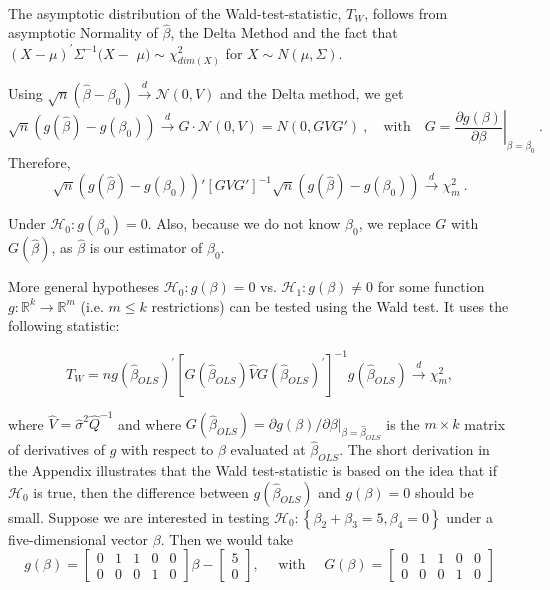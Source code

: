 \begin{definition}\label{Wald Test}
  \ 

  The asymptotic distribution of the Wald-test-statistic, $T_W$,
  follows from asymptotic Normality of $\hat{\beta}$, 
  the Delta Method and the fact that $(X-\mu)^\prime\Sigma^{-1}(X-$ $\mu)\sim\chi_{dim(X)}^2$ for $X\sim N(\mu,\Sigma).$

  Using $\sqrt{n}(\hat{\beta}-\beta_{0})\stackrel{d}{\rightarrow}\mathcal{N}(0, V)$ and the Delta method, we get
  $$\sqrt{n}\left(g(\hat{\beta})-g(\beta_0)\right)\overset{d}{\to}G\cdot \mathcal{N}(0, V)=N(0,GVG')\:,\quad\mathrm{with}\quad G=\left.\frac{\partial g(\beta)}{\partial\beta}\right|_{\beta=\beta_0}\:.$$
  Therefore,
  $$\sqrt{n}\left(g(\hat{\beta})-g(\beta_0)\right)'[GVG']^{-1}\sqrt{n}\left(g(\hat{\beta})-g(\beta_0)\right)\stackrel{d}{\to}\chi_m^2\:.$$

  Under $\mathcal{H}_0: g(\beta_0)=0.$ Also, because we do not know $\beta_0$, we replace $G$ with $G(\hat{\beta})$, as $\hat{\beta}$ is our
  estimator of $\beta_0.$
\end{definition}

More general hypotheses  $\mathcal{H}_{0}: g(\beta)=0 $ vs.  $\mathcal{H}_{1}: g(\beta) \neq 0$  for some function  $g: \mathbb{R}^{k} \rightarrow \mathbb{R}^{m}$  (i.e. $ m \leq k $ restrictions) can be tested using the Wald test. It uses the following statistic:

$$T_{W}=n g\left(\hat{\beta}_{O L S}\right)^{\prime}\left[G\left(\hat{\beta}_{O L S}\right) \hat{V} G\left(\hat{\beta}_{O L S}\right)^{\prime}\right]^{-1} g\left(\hat{\beta}_{O L S}\right) \xrightarrow{d} \chi_{m}^{2},$$

where $\hat{V}=\hat{\sigma}^{2} \hat{Q}^{-1}$ and where  $G\left(\hat{\beta}_{O L S}\right)=\partial g(\beta) /\left.\partial \beta\right|_{\beta=\hat{\beta}_{O L S}}$  is the $m \times k$ matrix of derivatives of $g$ with respect to $\beta$  evaluated at  $\hat{\beta}_{OLS}$. 
The short derivation in the Appendix illustrates that the Wald test-statistic is based on the idea that if $\mathcal{H}_{0}$  is true, then the difference between  $g\left(\hat{\beta}_{O L S}\right)$ and $g(\beta)=0$ should be small. Suppose we are interested in testing  $\mathcal{H}_{0}:\left\{\beta_{2}+\beta_{3}=5, \beta_{4}=0\right\}$ under a five-dimensional vector $\beta$. 
Then we would take
\[
g(\beta)=\left[\begin{array}{lllll}
0 & 1 & 1 & 0 & 0 \\
0 & 0 & 0 & 1 & 0
\end{array}\right] \beta-\left[\begin{array}{l}
5 \\
0
\end{array}\right], \quad \text { with } \quad G(\beta)=\left[\begin{array}{lllll}
0 & 1 & 1 & 0 & 0 \\
0 & 0 & 0 & 1 & 0
\end{array}\right]
\]

